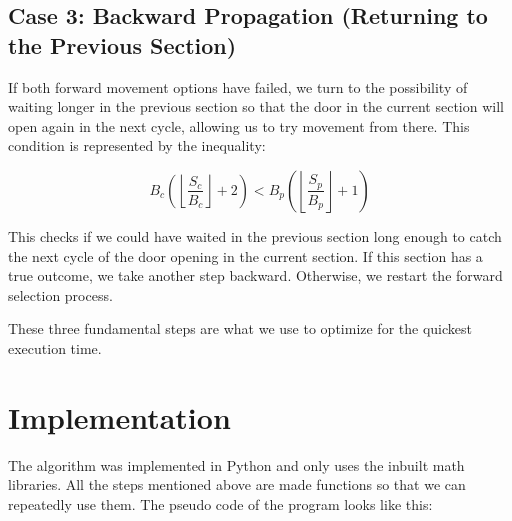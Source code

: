 \documentclass[a4paper,10pt,english]{scrartcl}
\begin{document}
\subsection*{Case 3: Backward Propagation (Returning to the Previous Section)}
If both forward movement options have failed, we turn to the possibility of waiting longer in the previous section so that the door in the current section will open again in the next cycle, allowing us to try movement from there. This condition is represented by the inequality:

\[
B_c\left(\left\lfloor\frac{S_c}{B_c}\right\rfloor+2\right) < B_p\left(\left\lfloor\frac{S_p}{B_p}\right\rfloor+1\right)
\]

This checks if we could have waited in the previous section long enough to catch the next cycle of the door opening in the current section. If this section has a true outcome, we take another step backward. Otherwise, we restart the forward selection process.

These three fundamental steps are what we use to optimize for the quickest execution time.

\section{Implementation}
The algorithm was implemented in Python and only uses the inbuilt math libraries. All the steps mentioned above are made functions so that we can repeatedly use them. The pseudo code of the program looks like this:
\end{document}
